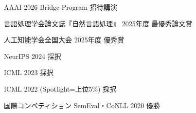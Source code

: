 \begin{cvsmallitemize}
  \item AAAI 2026 Bridge Program 招待講演
  \item 言語処理学会論文誌『自然言語処理』 2025年度 最優秀論文賞
  \item 人工知能学会全国大会 2025年度 優秀賞
  \item NeurIPS 2024 採択
  \item ICML 2023 採択
  \item ICML 2022 (Spotlight=上位5\%) 採択
  \item 国際コンペティション SemEval・CoNLL 2020 優勝
\end{cvsmallitemize}
